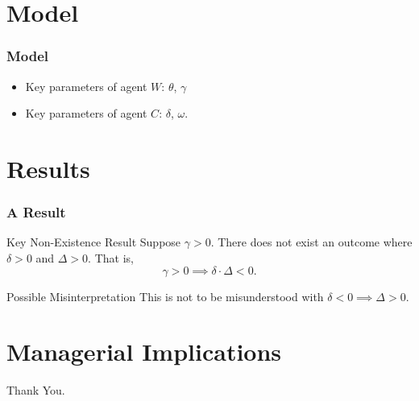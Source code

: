 \documentclass[9pt, mathserif]{beamer}
\begin{document}
\section{Model}

\begin{frame}
\frametitle{Model}
\begin{itemize}[<+->]\setlength\itemsep{2em}
\item Key parameters of agent $W$: $\theta$, $\gamma$

\item Key parameters of agent $C$: $\delta$, $\omega$.

\end{itemize}


\end{frame}

\section{Results}

\begin{frame}
\frametitle{A Result}

\begin{block}{Key Non-Existence Result}
Suppose $\gamma > 0$. There does not exist an outcome where $\delta > 0$ and $\Delta > 0$. That is,
\begin{equation*}
\gamma > 0 \implies \delta \cdot \Delta < 0.
\end{equation*}
\end{block}
\pause
\begin{block}{Possible Misinterpretation}
This is not to be misunderstood with $\delta < 0 \implies \Delta > 0$.
\end{block}

\end{frame}

\section[Implications]{Managerial Implications}

\begin{frame}
\begin{center}
\Huge \textcolor{asumaroon}{Thank You.}
\end{center}

\end{frame}
\end{document}
